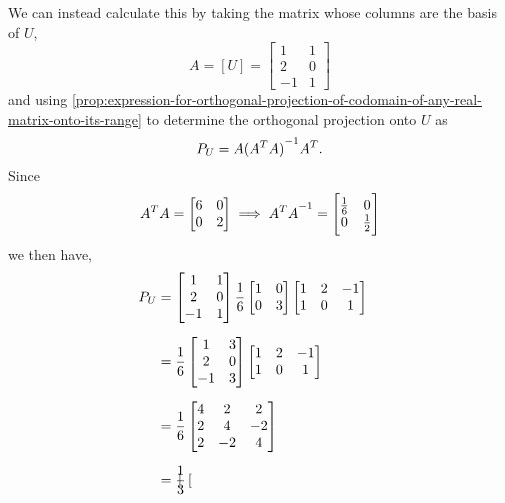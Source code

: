 \documentclass[../MathsNotesBase.tex]{subfiles}
\begin{document}
{\begin{exe}
{{			We can instead calculate this by taking the matrix whose columns are the basis of $U$,
			\[
				A = [U] = 	\begin{bmatrix}
								1 & 1\\
								2 & 0\\
								-1 & 1
							\end{bmatrix}
			\]
			and using \autoref{prop:expression-for-orthogonal-projection-of-codomain-of-any-real-matrix-onto-its-range} to determine the orthogonal projection onto $U$ as
			\[ P_U = A {(A^T A)}^{-1} A^T. \]
			Since
			\[ 
				A^T A = \begin{bmatrix}
							6 & 0\\
							0 & 2
						\end{bmatrix} \implies
						{A^T A}^{-1} = 
						\begin{bmatrix}
							\frac{1}{6} & 0\\
							0 & \frac{1}{2}
						\end{bmatrix}
			\]
			we then have,
			\[\begin{aligned}
				P_U &= 	\begin{bmatrix}
							1 & 1\\
							2 & 0\\
							-1 & 1
						\end{bmatrix}
						\frac{1}{6}
						\begin{bmatrix}
							1 & 0\\
							0 & 3
						\end{bmatrix}
						\begin{bmatrix}
							1 & 2 & -1\\
							1 & 0 & 1
						\end{bmatrix}
						&\sidecomment{} \nn
				&= 	\frac{1}{6}
					\begin{bmatrix}
						1 & 3\\
						2 & 0\\
						-1 & 3
					\end{bmatrix} 
					\begin{bmatrix}
						1 & 2 & -1\\
						1 & 0 & 1
					\end{bmatrix}
					&\sidecomment{} \nn
				&= 	\frac{1}{6}
					\begin{bmatrix}
						4 & 2 & 2 \\
						2 & 4 & -2 \\
						2 & -2 & 4
					\end{bmatrix}
					&\sidecomment{} \nn
				&= 	\frac{1}{3}
					\begin{bmatrix}

\end{bmatrix}
\end{aligned}\]}}
\end{exe}}
\end{document}
